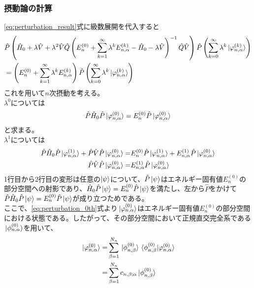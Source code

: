 \documentclass{ltjsarticle}
\begin{document}
\subsubsection{摂動論の計算}
\eqref{eq:perturbation_result}式に級数展開を代入すると
\begin{align}
  &\hat{P}\left( \hat{H}_0+\lambda\hat{V}+\lambda^2\hat{V}\hat{Q}\left( E_n^{(0)}+\sum_{k=1}^{\infty}\lambda^k E^{(k)}_{n,\alpha}-\hat{H}_0-\lambda \hat{V} \right)^{-1}\hat{Q}\hat{V} \right)\hat{P}\left( \sum_{k=0}^{\infty}\lambda^k\ket*{\varphi^{(k)}_{n,\alpha}} \right) \\
  &=\left( E_n^{(0)}+\sum_{k=1}^{\infty}\lambda^kE^{(k)}_{n,\alpha} \right) \hat{P}\left( \sum_{k=0}^{\infty}\lambda^k\ket*{\varphi^{(k)}_{n,\alpha}} \right) \\
\end{align}
これを用いて$n$次摂動を考える。\\
$\lambda^0$については
\begin{align}
  \hat{P}\hat{H}_0\hat{P}\ket*{\varphi^{(0)}_{n,\alpha}}=E_n^{(0)}\hat{P}\ket*{\varphi^{(0)}_{n,\alpha}}
  \label{eq:perturbation_0th}
\end{align}
と求まる。\\
$\lambda^1$については
\begin{align}
  \hat{P}\hat{H}_0\hat{P}\ket*{\varphi^{(1)}_{n,\alpha}}+\hat{P}\hat{V}\hat{P}\ket*{\varphi^{(0)}_{n,\alpha}}=&E_n^{(0)}\hat{P}\ket*{\varphi^{(1)}_{n,\alpha}}+E^{(1)}_{n,\alpha}\hat{P}\ket*{\varphi^{(0)}_{n,\alpha}}\\
  \hat{P}\hat{V}\hat{P}\ket*{\varphi^{(0)}_{n,\alpha}}=&E^{(1)}_{n,\alpha}\hat{P}\ket*{\varphi^{(0)}_{n,\alpha}}
  \label{eq:perturbation_1st}
\end{align}
1行目から2行目の変形は任意の$\ket{\psi}$について、$\hat{P}\ket{\psi}$はエネルギー固有値$E_n^{(0)}$の部分空間への射影であり、$\hat{H}_0\hat{P}\ket{\psi}=E_n^{(0)}\hat{P}\ket{\psi}$を満たし、左から$\hat{P}$をかけて$\hat{P}\hat{H}_0\hat{P}\ket{\psi}=E_n^{(0)}\hat{P}\ket{\psi}$が成り立つためである。\\
ここで、\eqref{eq:perturbation_0th}式より$\ket*{\varphi^{(0)}_{n,\alpha}}$はエネルギー固有値$E_n^{(0)}$の部分空間における状態である。したがって、その部分空間において正規直交完全系である$\ket*{\phi^{(0)}_{n,\alpha}}$を用いて、
\begin{align}
  \ket*{\varphi^{(0)}_{n,\alpha}}=&\sum_{\beta=1}^{N_n}\ket*{\phi^{(0)}_{n,\beta}}\braket*{\phi^{(0)}_{n,\beta}}{\varphi^{(0)}_{n,\alpha}}\\
  =&\sum_{\beta=1}^{N_n}c_{n,\beta;\alpha}\ket*{\phi^{(0)}_{n,\beta}}\\
\end{align}
\end{document}
